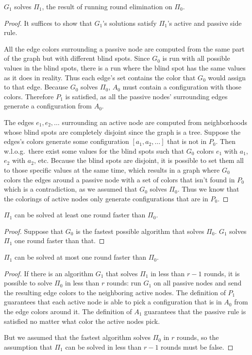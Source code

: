 \documentclass[english, 12pt, a4paper, sci, a-1b, online]{aaltothesis}
\begin{document}
\begin{lemma}
  $G_1$ solves $\Pi_1$, the result of running round elimination on $\Pi_0$.
\end{lemma}
\begin{proof}
  It suffices to show that $G_1$'s solutions satisfy $\Pi_1$'s active and passive side rule.

  All the edge colors surrounding a passive node are computed from the same part of the graph but with different blind spots. Since $G_0$ is run  with all possible values in the blind spots, there is a run where the blind spot has the same values as it does in reality. Thus each edge's set contains the color that $G_0$ would assign to that edge. Because $G_0$ solves $\Pi_0$, $A_0$ must contain a configuration with those colors. Therefore $P_1$ is satisfied, as all the passive nodes' surrounding edges generate a configuration from $A_0$.

  The edges $e_1, e_2, \ldots$ surrounding an active node are computed from neighborhoods whose blind spots are completely disjoint since the graph is a tree. Suppose the edges's colors generate some configuration $[a_1, a_2, \ldots]$ that is not in $P_0$. Then w.l.o.g.\ there exist some values for the blind spots such that $G_0$ colors $e_1$ with $a_1$, $e_2$ with $a_2$, etc. Because the blind spots are disjoint, it is possible to set them all to those specific values at the same time, which results in a graph where $G_0$ colors the edges around a passive node with a set of colors that isn't found in $P_0$ which is a contradiction, as we assumed that $G_0$ solves $\Pi_0$. Thus we know that the colorings of active nodes only generate configurations that are in $P_0$.
\end{proof}

\begin{lemma}
  $\Pi_1$ can be solved at least one round faster than $\Pi_0$.
\end{lemma}
\begin{proof}
  Suppose that $G_0$ is the fastest possible algorithm that solves $\Pi_0$. $G_1$ solves $\Pi_1$ one round faster than that.
\end{proof}

\begin{lemma}
  $\Pi_1$ can be solved at most one round faster than $\Pi_0$.
\end{lemma}
\begin{proof}
  If there is an algorithm $G_1$ that solves $\Pi_1$ in less than $r-1$ rounds, it is possible to solve $\Pi_0$ in less than $r$ rounds: run $G_1$ on all passive nodes and send the resulting edge colors to the neighboring active nodes. The definition of $P_1$ guarantees that each active node is able to pick a configuration that is in $A_0$ from the edge colors around it. The definition of $A_1$ guarantees that the passive rule is satisfied no matter what color the active nodes pick.

  But we assumed that the fastest algorithm solves $\Pi_0$ in $r$ rounds, so the assumption that $\Pi_1$ can be solved in less than $r-1$ rounds must be false.
\end{proof}
\end{document}

